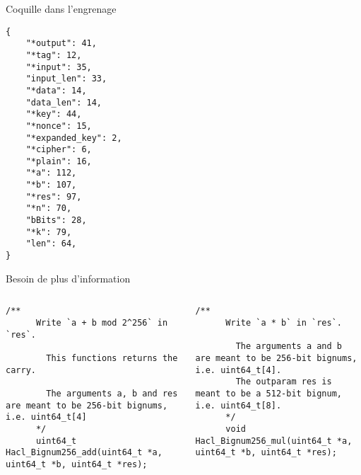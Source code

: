 \documentclass[A4,svgnames,9pt,aspectratio=169]{beamer}
\begin{document}

\begin{frame}[fragile]{Coquille dans l'engrenage}

      \begin{lstlisting}[style=CStyle, caption={counting.json}]
{
    "*output": 41,
    "*tag": 12,
    "*input": 35,
    "input_len": 33,
    "*data": 14,
    "data_len": 14,
    "*key": 44,
    "*nonce": 15,
    "*expanded_key": 2,
    "*cipher": 6,
    "*plain": 16,
    "*a": 112,
    "*b": 107,
    "*res": 97,
    "*n": 70,
    "bBits": 28,
    "*k": 79,
    "len": 64,
}
      \end{lstlisting}

\end{frame}


\begin{frame}[fragile]{Besoin de plus d'information}
  \begin{columns}
    \begin{column}{0.5\textwidth}
      \begin{lstlisting}[style=CStyle, caption={Hacl\_Bignum256.h}, gobble=6]
      /**
      Write `a + b mod 2^256` in `res`.

        This functions returns the carry.

        The arguments a, b and res are meant to be 256-bit bignums, i.e. uint64_t[4]
      */
      uint64_t Hacl_Bignum256_add(uint64_t *a, uint64_t *b, uint64_t *res);
    \end{lstlisting}
    \end{column}
    \begin{column}{0.5\textwidth}
    \begin{lstlisting}[style=CStyle, caption={Hacl\_Bignum256.h}, gobble=6]
      /**
      Write `a * b` in `res`.

        The arguments a and b are meant to be 256-bit bignums, i.e. uint64_t[4].
        The outparam res is meant to be a 512-bit bignum, i.e. uint64_t[8].
      */
      void Hacl_Bignum256_mul(uint64_t *a, uint64_t *b, uint64_t *res);
    \end{lstlisting}
    \end{column}
  \end{columns}
\end{frame}

\end{document}

